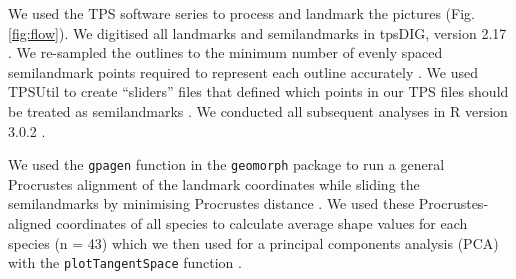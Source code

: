 \documentclass[12pt,a4paper]{article}
\begin{document}

	We used the TPS software series \citep{SUNY2009} to process and landmark the pictures (Fig. \ref{fig:flow}). We digitised all landmarks and semilandmarks in tpsDIG, version 2.17 \citep{Rohlf2013}. We re-sampled the outlines to the minimum number of evenly spaced semilandmark points required to represent each outline accurately \citep[][details in supplementary material]{MacLeod2013}. We used TPSUtil \citep{Rohlf2012} to create ``sliders'' files that defined which points in our TPS files should be treated as semilandmarks \citep{Zelditch2012}. We conducted all subsequent analyses in R version 3.0.2 \citep[][Fig. \ref{fig:flow}]{Team2014}. 
	
	We used the \texttt{gpagen} function in the \texttt{geomorph} package \citep{Adams2013} to run a general Procrustes alignment \citep{Rohlf1993} of the landmark coordinates while sliding the semilandmarks by minimising Procrustes distance \citep{Bookstein1997}. We used these Procrustes-aligned coordinates of all species to calculate average shape values for each species (n = 43) which we then used for a principal components analysis (PCA) with the \texttt{plotTangentSpace} function \citep{Adams2013}. 
	


\end{document}
